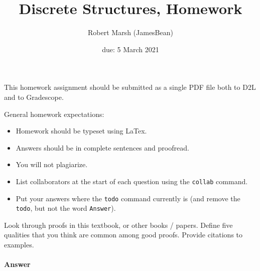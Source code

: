 \documentclass{article}
\title{Discrete Structures, Homework \hwnum}
\author{Robert Marsh (JamesBean)}
\date{due: 5 March 2021}
\begin{document}
\maketitle

This homework assignment should be
submitted as a single PDF file both to D2L and to Gradescope.

General homework expectations:
\begin{itemize}
    \item Homework should be typeset using LaTex.
    \item Answers should be in complete sentences and proofread.
    \item You will not plagiarize.
    \item List collaborators at the start of each question using the \texttt{collab} command.
    \item Put your answers where the \texttt{todo} command currently is (and
        remove the \texttt{todo}, but not the word \texttt{Answer}).
\end{itemize}


\collab{} 

Look through proofs in this textbook, or other books / papers.  Define five
qualities that you think are common among good proofs. Provide citations to
examples.


\paragraph{Answer}
\end{document}
